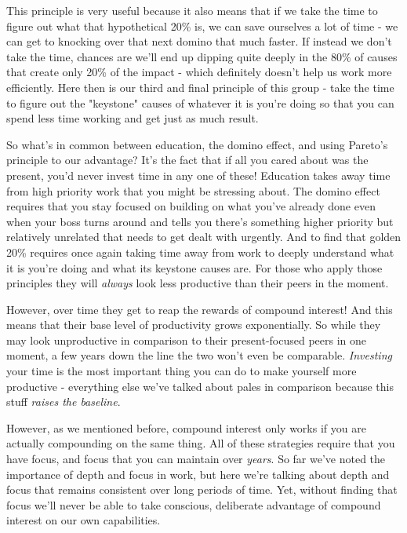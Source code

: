 \documentclass[11pt,a5paper]{book}
\begin{document}
This principle is very useful because it also means that if we take the time to figure out what that hypothetical 20\% is, we can save ourselves a lot of time - we can get to knocking over that next domino that much faster. If instead we don't take the time, chances are we'll end up dipping quite deeply in the 80\% of causes that create only 20\% of the impact - which definitely doesn't help us work more efficiently. Here then is our third and final principle of this group - take the time to figure out the "keystone" causes of whatever it is you're doing so that you can spend less time working and get just as much result.
\newline

So what's in common between education, the domino effect, and using Pareto's principle to our advantage? It's the fact that if all you cared about was the present, you'd never invest time in any one of these! Education takes away time from high priority work that you might be stressing about. The domino effect requires that you stay focused on building on what you've already done even when your boss turns around and tells you there's something higher priority but relatively unrelated that needs to get dealt with urgently. And to find that golden 20\% requires once again taking time away from work to deeply understand what it is you're doing and what its keystone causes are. For those who apply those principles they will \textit{always} look less productive than their peers in the moment. 
\newline

However, over time they get to reap the rewards of compound interest! And this means that their base level of productivity grows exponentially. So while they may look unproductive in comparison to their present-focused peers in one moment, a few years down the line the two won't even be comparable. \textit{Investing} your time is the most important thing you can do to make yourself more productive - everything else we've talked about pales in comparison because this stuff \textit{raises the baseline}. 
\newline

However, as we mentioned before, compound interest only works if you are actually compounding on the same thing. All of these strategies require that you have focus, and focus that you can maintain over \textit{years}. So far we've noted the importance of depth and focus in work, but here we're talking about depth and focus that remains consistent over long periods of time. Yet, without finding that focus we'll never be able to take conscious, deliberate advantage of compound interest on our own capabilities.
\end{document}
